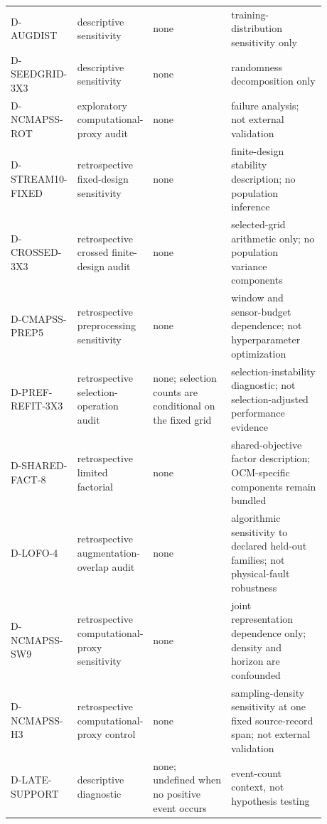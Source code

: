 {\begin{longtable}{p{0.13\linewidth}p{0.18\linewidth}p{0.26\linewidth}p{0.31\linewidth}}
D-AUGDIST & descriptive sensitivity & none & training-distribution sensitivity only \\
D-SEEDGRID-3X3 & descriptive sensitivity & none & randomness decomposition only \\
D-NCMAPSS-ROT & exploratory computational-proxy audit & none & failure analysis; not external validation \\
D-STREAM10-FIXED & retrospective fixed-design sensitivity & none & finite-design stability description; no population inference \\
D-CROSSED-3X3 & retrospective crossed finite-design audit & none & selected-grid arithmetic only; no population variance components \\
D-CMAPSS-PREP5 & retrospective preprocessing sensitivity & none & window and sensor-budget dependence; not hyperparameter optimization \\
D-PREF-REFIT-3X3 & retrospective selection-operation audit & none; selection counts are conditional on the fixed grid & selection-instability diagnostic; not selection-adjusted performance evidence \\
D-SHARED-FACT-8 & retrospective limited factorial & none & shared-objective factor description; OCM-specific components remain bundled \\
D-LOFO-4 & retrospective augmentation-overlap audit & none & algorithmic sensitivity to declared held-out families; not physical-fault robustness \\
D-NCMAPSS-SW9 & retrospective computational-proxy sensitivity & none & joint representation dependence only; density and horizon are confounded \\
D-NCMAPSS-H3 & retrospective computational-proxy control & none & sampling-density sensitivity at one fixed source-record span; not external validation \\
D-LATE-SUPPORT & descriptive diagnostic & none; undefined when no positive event occurs & event-count context, not hypothesis testing \\
\end{longtable}
}
